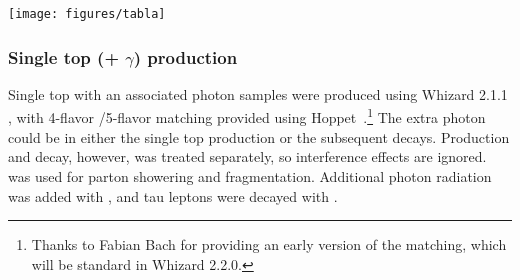\begin{table}[ht!]
  \centering
  \caption{\ttgam\ samples used for the analysis. The LO cross-section for specified decay mode, k-factors (for NLO normalisation) and filter efficiencies are reported. The integrated luminosities corresponding to the total statistics in each sample are also given. The bottom group of samples was used to study systematic uncertainties.}
  \texttt{[image: figures/tabla]}
  \label{tab:bkg_ttbar_samples}
\end{table}

\subsubsection{Single top (+ $\gamma$) production}

Single top with an associated photon samples were produced using
Whizard 2.1.1 \cite{whizard, whizard2}, with 4-flavor /5-flavor
matching provided using Hoppet~\cite{hoppet}.\footnote{Thanks to
Fabian Bach for providing an early version of the matching, which
will be standard in Whizard 2.2.0.} The extra photon could be in
either the single top production or the subsequent decays. Production
and decay, however, was treated separately, so interference effects
are ignored. {\pythia} \cite{pythia} was used for parton showering and
fragmentation. Additional photon radiation was added with
{\photos} \cite{photos}, and tau leptons were decayed with
{\tauola} \cite{tauola}.

